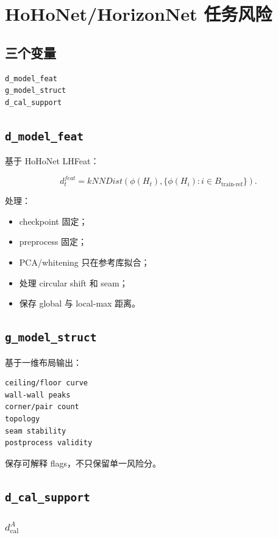 \section{HoHoNet/HorizonNet 任务风险}

\subsection{三个变量}

\begin{verbatim}
d_model_feat
g_model_struct
d_cal_support
\end{verbatim}

\subsection{\texttt{d\_model\_feat}}

基于 HoHoNet LHFeat：

\[
d^{feat}_t
=
kNNDist\left(
\phi(H_t),
\{\phi(H_i):i\in B_{\text{train-ref}}\}
\right).
\]

处理：

\begin{itemize}
  \item checkpoint 固定；
  \item preprocess 固定；
  \item PCA/whitening 只在参考库拟合；
  \item 处理 circular shift 和 seam；
  \item 保存 global 与 local-max 距离。
\end{itemize}

\subsection{\texttt{g\_model\_struct}}

基于一维布局输出：

\begin{verbatim}
ceiling/floor curve
wall-wall peaks
corner/pair count
topology
seam stability
postprocess validity
\end{verbatim}

保存可解释 flags，不只保留单一风险分。

\subsection{\texttt{d\_cal\_support}}

\subsubsection{\texorpdfstring{\(d_{\text{cal}}^A\)}{dcal-A}}


